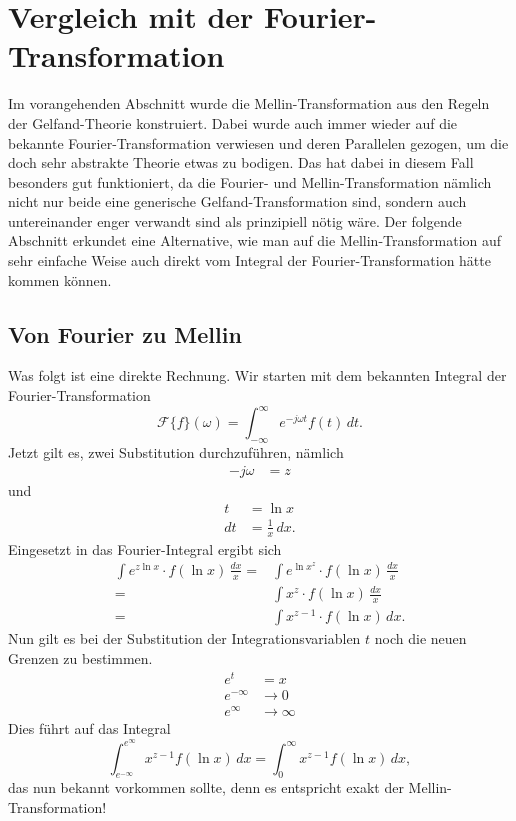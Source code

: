 %
%
%
%
\section{Vergleich mit der Fourier-Transformation
\label{mellin:section:teil3}}
Im vorangehenden Abschnitt wurde die Mellin-Transformation aus den 
Regeln der Gelfand-Theorie konstruiert. 
Dabei wurde auch immer wieder auf die bekannte Fourier-Transformation 
verwiesen und deren Parallelen gezogen, um die doch sehr abstrakte 
Theorie etwas zu bodigen.
Das hat dabei in diesem Fall besonders gut funktioniert, da die Fourier- 
und Mellin-Transformation nämlich nicht nur beide eine generische 
Gelfand-Transformation sind, sondern auch untereinander enger verwandt 
sind als prinzipiell nötig wäre.
Der folgende Abschnitt erkundet eine Alternative, wie man auf die 
Mellin-Transformation auf sehr einfache Weise auch direkt vom Integral 
der Fourier-Transformation hätte kommen können.

\subsection{Von Fourier zu Mellin
\label{mellin:subsection:foumel}}
Was folgt ist eine direkte Rechnung.
Wir starten mit dem bekannten Integral der Fourier-Trans\-for\-ma\-tion
\begin{equation}
    \mathcal{F}\{f \}(\omega) 
    = \int_{-\infty}^{\infty} e^{-j\omega{}t} f(t) \,{d}t
    .
    \label{mellin:fourier}
\end{equation}
Jetzt gilt es, zwei Substitution durchzuführen, nämlich
\begin{align*}
    -j\omega &= z
\end{align*}
und
\begin{align*}
    t &= \ln x \\
    {d}t &= \frac{1}{x}\,{d}x
    .
\end{align*}
Eingesetzt in das Fourier-Integral ergibt sich
\begin{align*}
    \int e^{z \ln x} \cdot f(\ln x) \,\frac{{d}x}{x}
    = &\int e^{\ln x^z} \cdot f(\ln x) \,\frac{{d}x}{x} \\
    = &\int x^{z} \cdot f(\ln x) \,\frac{{d}x}{x} \\
    = &\int x^{z-1} \cdot f(\ln x) \,{d}x
    .
\end{align*}
Nun gilt es bei der Substitution der Integrationsvariablen $t$ noch die 
neuen Grenzen zu bestimmen.
\begin{align*}
    e^{t} &= x \\
    e^{-\infty} &\rightarrow 0 \\
    e^{\infty} &\rightarrow \infty 
\end{align*}
Dies führt auf das Integral
\[
    \int_{e^{-\infty}}^{e^{\infty}} x^{z-1} f(\ln x) \,{d}x 
    = \int_{0}^{\infty} x^{z-1} f(\ln x) \,{d}x
    ,
\]
das nun bekannt vorkommen sollte, denn es entspricht exakt der 
Mellin-Transformation!
\medskip

